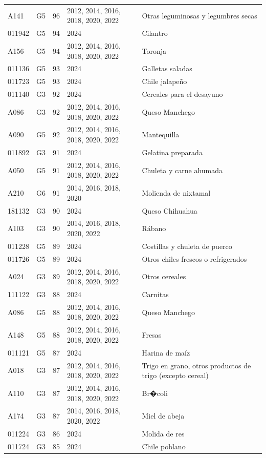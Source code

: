 \begin{table}[ht]
\begin{tabular}{llrll}
  A141 & G5 &  96 & 2012, 2014, 2016, 2018, 2020, 2022 & Otras leguminosas y legumbres secas \\ 
  011942 & G5 &  94 & 2024 & Cilantro \\ 
  A156 & G5 &  94 & 2012, 2014, 2016, 2018, 2020, 2022 & Toronja \\ 
  011136 & G5 &  93 & 2024 & Galletas saladas \\ 
  011723 & G5 &  93 & 2024 & Chile jalapeño \\ 
  011140 & G3 &  92 & 2024 & Cereales para el desayuno \\ 
  A086 & G3 &  92 & 2012, 2014, 2016, 2018, 2020, 2022 & Queso Manchego \\ 
  A090 & G5 &  92 & 2012, 2014, 2016, 2018, 2020, 2022 & Mantequilla \\ 
  011892 & G3 &  91 & 2024 & Gelatina preparada \\ 
  A050 & G5 &  91 & 2012, 2014, 2016, 2018, 2020, 2022 & Chuleta y carne ahumada \\ 
  A210 & G6 &  91 & 2014, 2016, 2018, 2020 & Molienda de nixtamal \\ 
  181132 & G3 &  90 & 2024 & Queso Chihuahua \\ 
  A103 & G3 &  90 & 2014, 2016, 2018, 2020, 2022 & Rábano \\ 
  011228 & G5 &  89 & 2024 & Costillas y chuleta de puerco \\ 
  011726 & G5 &  89 & 2024 & Otros chiles frescos o refrigerados \\ 
  A024 & G3 &  89 & 2012, 2014, 2016, 2018, 2020, 2022 & Otros cereales \\ 
  111122 & G3 &  88 & 2024 & Carnitas \\ 
  A086 & G5 &  88 & 2012, 2014, 2016, 2018, 2020, 2022 & Queso Manchego \\ 
  A148 & G5 &  88 & 2012, 2014, 2016, 2018, 2020, 2022 & Fresas \\ 
  011121 & G5 &  87 & 2024 & Harina de maíz \\ 
  A018 & G3 &  87 & 2012, 2014, 2016, 2018, 2020, 2022 & Trigo en grano, otros productos de trigo (excepto cereal) \\ 
  A110 & G3 &  87 & 2012, 2014, 2016, 2018, 2020, 2022 & Br�coli \\ 
  A174 & G3 &  87 & 2014, 2016, 2018, 2020, 2022 & Miel de abeja \\ 
  011224 & G3 &  86 & 2024 & Molida de res \\ 
  011724 & G3 &  85 & 2024 & Chile poblano \\ 

\end{tabular}
\end{table}
